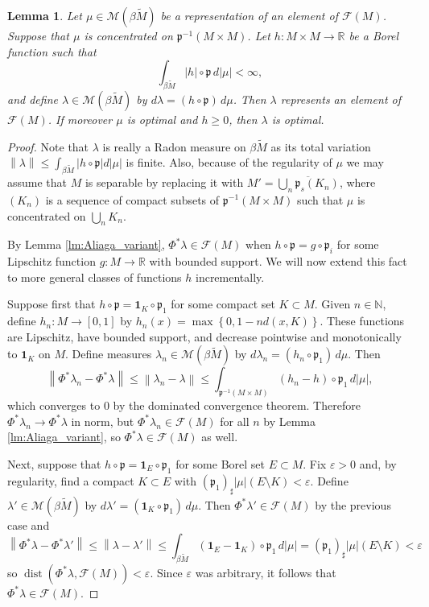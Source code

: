 \documentclass[a4paper,10pt]{amsart}
\DeclareMathOperator{\dist}{dist}                           %
\newcommand{\NN}{\mathbb{N}}                                %
\newcommand{\RR}{\mathbb{R}}                                %
\newcommand{\abs}[1]{\left|{#1}\right|}                     %
\newcommand{\set}[1]{\left\{{#1}\right\}}                   %
\newcommand{\norm}[1]{\left\|{#1}\right\|}                  %
\newcommand{\cl}[1]{\overline{#1}}                          %
\newcommand{\lipfree}[1]{\mathcal{F}({#1})}                 %
\newcommand{\meas}[1]{\mathcal{M}({#1})}                    %
\newcommand{\wt}[1]{\widetilde{#1}}                         %
\newcommand{\bwt}[1]{\beta\wt{#1}}                          %
\newcommand{\pp}{\mathfrak{p}}                              %
\renewcommand{\leq}{\leqslant}
\renewcommand{\geq}{\geqslant}
\theoremstyle{plain}
\newtheorem{lemma}[theorem]{Lemma}
\theoremstyle{definition}
\theoremstyle{remark}
\begin{document}
\begin{lemma}\label{lm:Aliaga_Borel}
Let $\mu\in\meas{\bwt{M}}$ be a representation of an element of $\lipfree{M}$. Suppose that $\mu$ is concentrated on $\pp^{-1}(M \times M)$. Let $h:M\times M\to\RR$ be a Borel function such that
$$
\int_{\bwt{M}} \abs{h}\circ\pp\, d\abs{\mu} < \infty ,
$$
and define $\lambda\in\meas{\bwt{M}}$ by $d\lambda = (h\circ\pp)\,d\mu$. Then $\lambda$ represents an element of $\lipfree{M}$. If moreover $\mu$ is optimal and $h\geq 0$, then $\lambda$ is optimal.
\end{lemma}


\begin{proof}
Note that $\lambda$ is really a Radon measure on $\bwt{M}$ as its total variation $\norm{\lambda} \leq \int_{\bwt{M}}\abs{h\circ\pp}d\abs{\mu}$ is finite. Also, because of the regularity of $\mu$ we may assume that $M$ is separable by replacing it with $M'=\cl{\bigcup_n \pp_s(K_n)}$, where $(K_n)$ is a sequence of compact subsets of $\pp^{-1}(M\times M)$ such that $\mu$ is concentrated on $\bigcup_n K_n$.

By Lemma \ref{lm:Aliaga_variant}, $\Phi^*\lambda\in\lipfree{M}$ when $h\circ\pp=g\circ\pp_i$ for some Lipschitz function $g:M\to\RR$ with bounded support. We will now extend this fact to more general classes of functions $h$ incrementally.

Suppose first that $h\circ\pp=\mathbf{1}_K\circ\pp_1$ for some compact set $K\subset M$. Given $n \in \NN$, define $h_n:M\to[0,1]$ by $h_n(x)=\max\set{0,1-nd(x,K)}$. These functions are Lipschitz, have bounded support, and decrease pointwise and monotonically to $\mathbf{1}_K$ on $M$. Define measures $\lambda_n\in\meas{\bwt{M}}$ by $d\lambda_n=(h_n \circ \pp_1)\,d\mu$. Then 
$$
\norm{\Phi^*\lambda_n-\Phi^*\lambda} \leq \norm{\lambda_n-\lambda}
\leq \int_{\pp^{-1}(M\times M)} (h_n-h) \circ \pp_1 \,d\abs{\mu} ,
$$
which converges to $0$ by the dominated convergence theorem. Therefore $\Phi^*\lambda_n\to \Phi^*\lambda$ in norm, but $\Phi^*\lambda_n\in\lipfree{M}$ for all $n$ by Lemma \ref{lm:Aliaga_variant}, so $\Phi^*\lambda\in \lipfree{M}$ as well.
 

Next, suppose that $h\circ\pp=\mathbf{1}_E\circ\pp_1$ for some Borel set $E\subset M$. Fix $\varepsilon>0$ and, by regularity, find a compact $K\subset E$ with $(\pp_1)_\sharp\abs{\mu}(E\setminus K)<\varepsilon$. Define $\lambda'\in\meas{\bwt{M}}$ by $d\lambda'=(\mathbf{1}_K\circ\pp_1)\,d\mu$. Then $\Phi^*\lambda'\in\lipfree{M}$ by the previous case and
$$
\norm{\Phi^*\lambda-\Phi^*\lambda'} \leq \norm{\lambda-\lambda'} \leq \int_{\bwt{M}} (\mathbf{1}_E-\mathbf{1}_K)\circ\pp_1\,d\abs{\mu} = (\pp_1)_\sharp\abs{\mu}(E\setminus K) < \varepsilon
$$
so $\dist(\Phi^*\lambda,\lipfree{M})<\varepsilon$. Since $\varepsilon$ was arbitrary, it follows that $\Phi^*\lambda\in\lipfree{M}$.


\end{proof}
\end{document}
